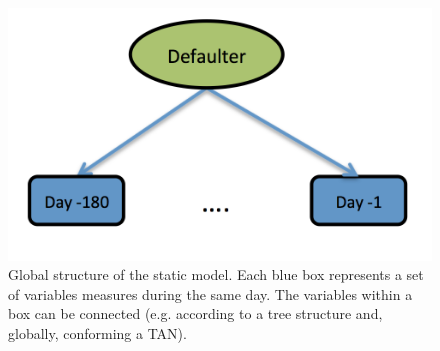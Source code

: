 \begin{figure}
\begin{center}
\includegraphics[scale=0.45]{./figures/CajaMarModel0}
\caption{\label{Figure:CajaMarStatic}Global structure of the static model. Each blue box represents a set of variables measures during the same day.
The variables within a box can be connected (e.g. according to a tree structure and, globally, conforming a TAN).}
\label{fig:static}
\end{center}
\end{figure}




